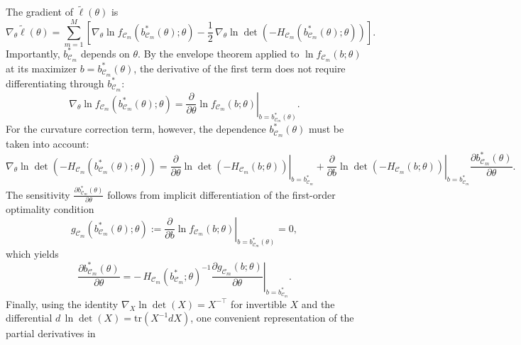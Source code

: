 \documentclass[12pt]{article}
\begin{document}
The gradient of \(\tilde\ell(\theta)\) is
\begin{equation}
\label{eq:grad_laplace_full}
\nabla_\theta \tilde\ell(\theta)
=
\sum_{m=1}^M
\left[
\nabla_\theta \ln f_{\mathcal{C}_m}(b_{\mathcal{C}_m}^*(\theta);\theta)
-\frac{1}{2}\,\nabla_\theta \ln\det\!\left(-H_{\mathcal{C}_m}(b_{\mathcal{C}_m}^*(\theta);\theta)\right)
\right].
\end{equation}
Importantly, \(b_{\mathcal{C}_m}^*\) depends on \(\theta\). By the envelope theorem applied to
\(\ln f_{\mathcal{C}_m}(b;\theta)\) at its maximizer \(b=b_{\mathcal{C}_m}^*(\theta)\), the derivative of the first term does not require differentiating through \(b_{\mathcal{C}_m}^*\):
\begin{equation}
\label{eq:envelope_term}
\nabla_\theta \ln f_{\mathcal{C}_m}(b_{\mathcal{C}_m}^*(\theta);\theta)
=
\left.\frac{\partial}{\partial\theta}\ln f_{\mathcal{C}_m}(b;\theta)\right\rvert_{b=b_{\mathcal{C}_m}^*(\theta)}.
\end{equation}
For the curvature correction term, however, the dependence \(b_{\mathcal{C}_m}^*(\theta)\) must be taken into account:
\begin{equation}
\label{eq:curvature_term_chainrule}
\nabla_\theta \ln\det\!\left(-H_{\mathcal{C}_m}(b_{\mathcal{C}_m}^*(\theta);\theta)\right)
=
\left.\frac{\partial}{\partial\theta}\ln\det\!\left(-H_{\mathcal{C}_m}(b;\theta)\right)\right\rvert_{b=b_{\mathcal{C}_m}^*}
+
\left.\frac{\partial}{\partial b}\ln\det\!\left(-H_{\mathcal{C}_m}(b;\theta)\right)\right\rvert_{b=b_{\mathcal{C}_m}^*}
\frac{\partial b_{\mathcal{C}_m}^*(\theta)}{\partial\theta}.
\end{equation}
The sensitivity \(\frac{\partial b_{\mathcal{C}_m}^*(\theta)}{\partial\theta}\) follows from implicit differentiation of the first-order optimality condition
\[
g_{\mathcal{C}_m}(b_{\mathcal{C}_m}^*(\theta);\theta)
:=
\left.\frac{\partial}{\partial b}\ln f_{\mathcal{C}_m}(b;\theta)\right\rvert_{b=b_{\mathcal{C}_m}^*(\theta)}
=0,
\]
which yields
\begin{equation}
\label{eq:dbdtheta}
\frac{\partial b_{\mathcal{C}_m}^*(\theta)}{\partial\theta}
=
-\,H_{\mathcal{C}_m}(b_{\mathcal{C}_m}^*;\theta)^{-1}
\left.\frac{\partial g_{\mathcal{C}_m}(b;\theta)}{\partial\theta}\right\rvert_{b=b_{\mathcal{C}_m}^*}.
\end{equation}
Finally, using the identity \(\nabla_X \ln\det(X)=X^{-\top}\) for invertible \(X\) and the differential
\(d\,\ln\det(X)=\mathrm{tr}(X^{-1}dX)\), one convenient representation of the partial derivatives in
\end{document}
